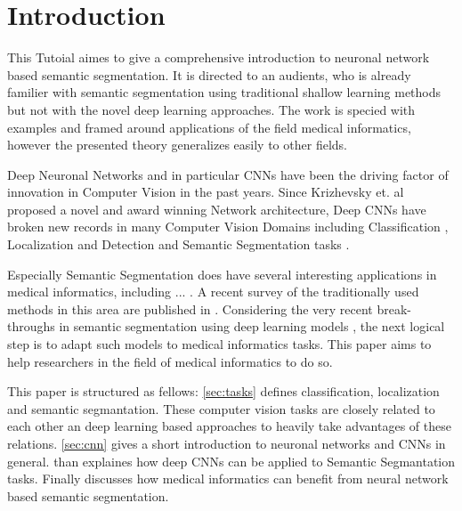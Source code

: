 \section{Introduction}\label{sec:introduction}

This Tutoial aimes to give a comprehensive introduction to neuronal network based semantic segmentation. It is directed to an audients, who is already familier with semantic segmentation using traditional shallow learning methods but not with the novel deep learning approaches. The work is specied with examples and framed around applications of the field medical informatics, however the presented theory generalizes easily to other fields. 

Deep Neuronal Networks and in particular \glspl{CNN} have been the driving factor of innovation in Computer Vision in the past years. Since Krizhevsky et. al \cite{AlexNet} proposed a novel and award winning Network architecture, Deep \glspl{CNN} have broken new records in many Computer Vision Domains including Classification \cite{AlexNet,VGG16,googLeNeT}, Localization and Detection \cite{RNN,overfeat} and Semantic Segmentation tasks \cite{fcn,CRF1,googleSeg}. 

Especially Semantic Segmentation does have several interesting applications in medical informatics, including ... . A recent survey of the traditionally used methods in this area are published in \cite{Martin}. Considering the very recent break-throughs in semantic segmentation using deep learning models \cite{fcn,CRF1}, the next logical step is to adapt such models to medical informatics tasks. This paper aims to help researchers in the field of medical informatics to do so. 

This paper is structured as fellows: \cref{sec:tasks} defines classification, localization and semantic segmantation. These computer vision tasks are closely related to each other an deep learning based approaches to heavily take advantages of these relations. \cref{sec:cnn} gives a short introduction to neuronal networks and \glspl{CNN} in general.  than explaines how deep \glspl{CNN} can be applied to Semantic Segmantation tasks. Finally  discusses how medical informatics can benefit from neural network based semantic segmentation.


